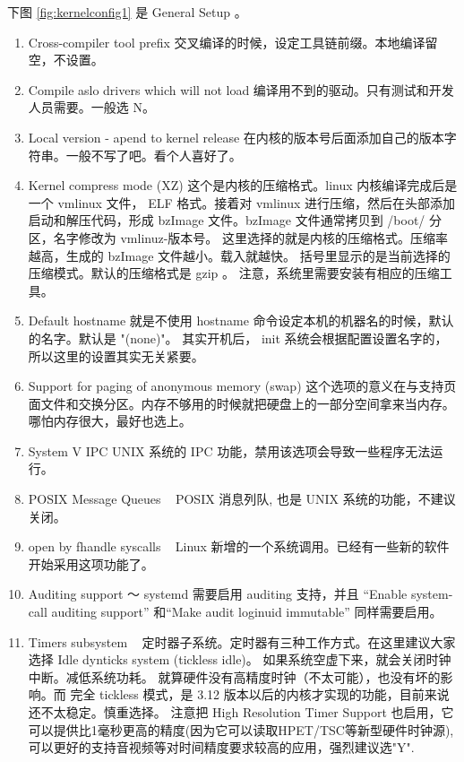 下图 \ref{fig:kernelconfig1} 是 General Setup 。


\begin{enumerate}
\item Cross-compiler tool prefix  交叉编译的时候，设定工具链前缀。本地编译留空，不设置。
\item Compile aslo drivers which will not load 编译用不到的驱动。只有测试和开发人员需要。一般选 N。
\item Local version - apend to kernel release 在内核的版本号后面添加自己的版本字符串。一般不写了吧。看个人喜好了。
\item Kernel compress mode (XZ) 这个是内核的压缩格式。linux 内核编译完成后是一个 vmlinux 文件， ELF 格式。接着对 vmlinux 进行压缩，然后在头部添加启动和解压代码，形成 bzImage 文件。bzImage 文件通常拷贝到 /boot/ 分区，名字修改为 vmlinuz-版本号。 这里选择的就是内核的压缩格式。压缩率越高，生成的 bzImage 文件越小。载入就越快。 括号里显示的是当前选择的压缩模式。默认的压缩格式是 gzip 。 注意，系统里需要安装有相应的压缩工具。

\item Default hostname 就是不使用 hostname 命令设定本机的机器名的时候，默认的名字。默认是 "(none)"。 其实开机后， init 系统会根据配置设置名字的，所以这里的设置其实无关紧要。
\item Support for paging of anonymous memory (swap) 这个选项的意义在与支持页面文件和交换分区。内存不够用的时候就把硬盘上的一部分空间拿来当内存。哪怕内存很大，最好也选上。
\item System V IPC UNIX 系统的 IPC 功能，禁用该选项会导致一些程序无法运行。
\item POSIX Message Queues ~  POSIX 消息列队, 也是 UNIX 系统的功能，不建议关闭。
\item open by fhandle syscalls ~ Linux 新增的一个系统调用。已经有一些新的软件开始采用这项功能了。
\item Auditing support ～ systemd 需要启用 auditing 支持，并且 ``Enable system-call auditing support'' 和``Make audit loginuid immutable'' 同样需要启用。
\item Timers subsystem ~ 定时器子系统。定时器有三种工作方式。在这里建议大家选择 Idle dynticks system (tickless idle)。 如果系统空虚下来，就会关闭时钟中断。减低系统功耗。 
就算硬件没有高精度时钟（不太可能），也没有坏的影响。而 完全 tickless 模式，是 3.12 版本以后的内核才实现的功能，目前来说还不太稳定。慎重选择。
注意把 High Resolution Timer Support 也启用，它可以提供比1毫秒更高的精度(因为它可以读取HPET/TSC等新型硬件时钟源),可以更好的支持音视频等对时间精度要求较高的应用，强烈建议选"Y".


\end{enumerate}
